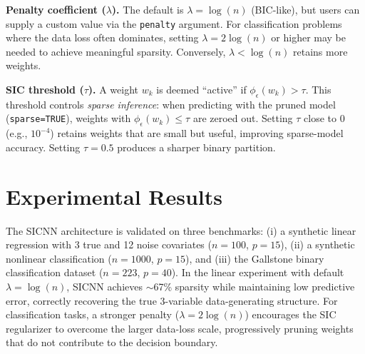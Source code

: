 \documentclass{article}
\begin{document}
\textbf{Penalty coefficient ($\lambda$).} The default is $\lambda = \log(n)$ (BIC-like), but users can supply a custom value via the \texttt{penalty} argument. For classification problems where the data loss often dominates, setting $\lambda = 2\log(n)$ or higher may be needed to achieve meaningful sparsity. Conversely, $\lambda < \log(n)$ retains more weights.

\textbf{SIC threshold ($\tau$).} A weight $w_k$ is deemed ``active'' if $\phi_\epsilon(w_k) > \tau$. This threshold controls \emph{sparse inference}: when predicting with the pruned model (\texttt{sparse=TRUE}), weights with $\phi_\epsilon(w_k) \le \tau$ are zeroed out. Setting $\tau$ close to 0 (e.g., $10^{-4}$) retains weights that are small but useful, improving sparse-model accuracy. Setting $\tau = 0.5$ produces a sharper binary partition.

\section{Experimental Results}
The SICNN architecture is validated on three benchmarks: (i) a synthetic linear regression with 3 true and 12 noise covariates ($n=100$, $p=15$), (ii) a synthetic nonlinear classification ($n=1000$, $p=15$), and (iii) the Gallstone binary classification dataset ($n=223$, $p=40$). In the linear experiment with default $\lambda = \log(n)$, SICNN achieves $\sim$67\% sparsity while maintaining low predictive error, correctly recovering the true 3-variable data-generating structure. For classification tasks, a stronger penalty ($\lambda = 2\log(n)$) encourages the SIC regularizer to overcome the larger data-loss scale, progressively pruning weights that do not contribute to the decision boundary.
\end{document}
